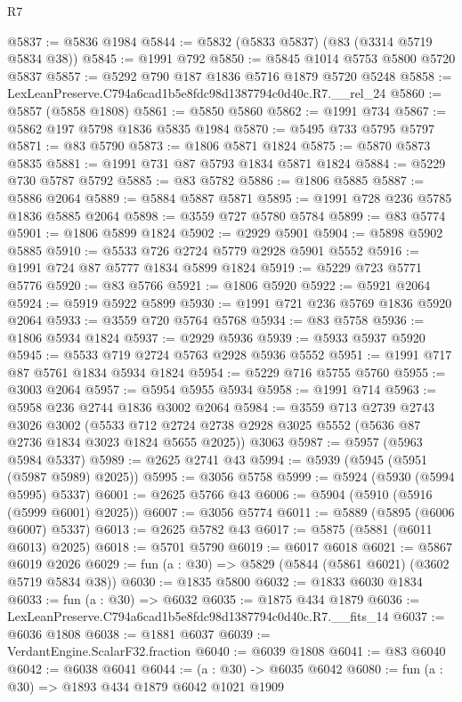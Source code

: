 \begin{lexlean}{R7}
\begin{coremodule}
@5837 := @5836 @1984
@5844 := @5832 (@5833 @5837) (@83 (@3314 @5719 @5834 @38))
@5845 := @1991 @792
@5850 := @5845 @1014 @5753 @5800 @5720 @5837
@5857 := @5292 @790 @187 @1836 @5716 @1879 @5720 @5248
@5858 := LexLeanPreserve.C794a6cad1b5e8fdc98d1387794c0d40c.R7.__rel_24
@5860 := @5857 (@5858 @1808)
@5861 := @5850 @5860
@5862 := @1991 @734
@5867 := @5862 @197 @5798 @1836 @5835 @1984
@5870 := @5495 @733 @5795 @5797
@5871 := @83 @5790
@5873 := @1806 @5871 @1824
@5875 := @5870 @5873 @5835
@5881 := @1991 @731 @87 @5793 @1834 @5871 @1824
@5884 := @5229 @730 @5787 @5792
@5885 := @83 @5782
@5886 := @1806 @5885
@5887 := @5886 @2064
@5889 := @5884 @5887 @5871
@5895 := @1991 @728 @236 @5785 @1836 @5885 @2064
@5898 := @3559 @727 @5780 @5784
@5899 := @83 @5774
@5901 := @1806 @5899 @1824
@5902 := @2929 @5901
@5904 := @5898 @5902 @5885
@5910 := @5533 @726 @2724 @5779 @2928 @5901 @5552
@5916 := @1991 @724 @87 @5777 @1834 @5899 @1824
@5919 := @5229 @723 @5771 @5776
@5920 := @83 @5766
@5921 := @1806 @5920
@5922 := @5921 @2064
@5924 := @5919 @5922 @5899
@5930 := @1991 @721 @236 @5769 @1836 @5920 @2064
@5933 := @3559 @720 @5764 @5768
@5934 := @83 @5758
@5936 := @1806 @5934 @1824
@5937 := @2929 @5936
@5939 := @5933 @5937 @5920
@5945 := @5533 @719 @2724 @5763 @2928 @5936 @5552
@5951 := @1991 @717 @87 @5761 @1834 @5934 @1824
@5954 := @5229 @716 @5755 @5760
@5955 := @3003 @2064
@5957 := @5954 @5955 @5934
@5958 := @1991 @714
@5963 := @5958 @236 @2744 @1836 @3002 @2064
@5984 := @3559
    @713
    @2739
    @2743
    @3026
    @3002
    (@5533 @712 @2724 @2738 @2928 @3025 @5552 (@5636 @87 @2736 @1834 @3023 @1824 @5655 @2025))
    @3063
@5987 := @5957 (@5963 @5984 @5337)
@5989 := @2625 @2741 @43
@5994 := @5939 (@5945 (@5951 (@5987 @5989) @2025))
@5995 := @3056 @5758
@5999 := @5924 (@5930 (@5994 @5995) @5337)
@6001 := @2625 @5766 @43
@6006 := @5904 (@5910 (@5916 (@5999 @6001) @2025))
@6007 := @3056 @5774
@6011 := @5889 (@5895 (@6006 @6007) @5337)
@6013 := @2625 @5782 @43
@6017 := @5875 (@5881 (@6011 @6013) @2025)
@6018 := @5701 @5790
@6019 := @6017 @6018
@6021 := @5867 @6019 @2026
@6029 := fun (a : @30) => @5829 (@5844 (@5861 @6021) (@3602 @5719 @5834 @38))
@6030 := @1835 @5800
@6032 := @1833 @6030 @1834
@6033 := fun (a : @30) => @6032
@6035 := @1875 @434 @1879
@6036 := LexLeanPreserve.C794a6cad1b5e8fdc98d1387794c0d40c.R7.__fits_14
@6037 := @6036 @1808
@6038 := @1881 @6037
@6039 := VerdantEngine.ScalarF32.fraction
@6040 := @6039 @1808
@6041 := @83 @6040
@6042 := @6038 @6041
@6044 := (a : @30) -> @6035 @6042
@6080 := fun (a : @30) =>
  @1893
    @434
    @1879
    @6042
    @1021
    @1909

\end{coremodule}
\end{lexlean}
